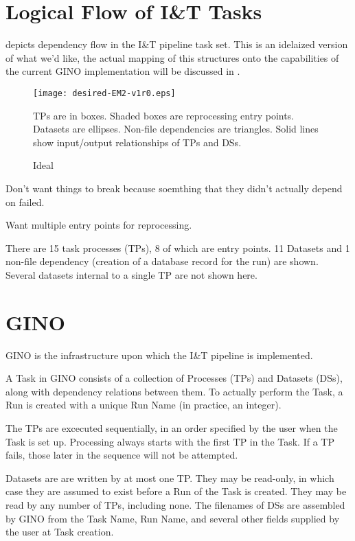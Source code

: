 \documentclass{article}
\begin{document}
\section{Logical Flow of I\&T Tasks}
\label{logic-sec}

{} depicts dependency flow in the I\&T pipeline task set.
This is an idelaized version of what we'd like, the actual mapping of this
structures onto the capabilities of the current GINO implementation will be
discussed in {}.

\begin{figure}
\caption{Ideal}

\texttt{[image: desired-EM2-v1r0.eps]}

{TPs are in boxes. Shaded boxes are reprocessing entry points.  Datasets are
ellipses. Non-file dependencies are triangles.  Solid lines show input/output
relationships of TPs and DSs.}

\label{desired-fig}
\end{figure}

Don't want things to break because soemthing that they didn't actually depend
on failed.

Want multiple entry points for reprocessing.

There are 15 task processes (TPs), 8 of which are entry points.  11 Datasets
and 1 non-file dependency (creation of a database record for the run) are
shown.  Several datasets internal to a single TP are not shown here.

\section{GINO}
\label{gino-sec}

GINO is the infrastructure upon which the I\&T pipeline is implemented.

A Task in GINO consists of a collection of Processes (TPs) and Datasets (DSs),
along with dependency relations between them.  To actually perform the Task, a
Run is created with a unique Run Name (in practice, an integer).

The TPs are excecuted sequentially, in an order specified by the user when the
Task is set up.  Processing always starts with the first TP in the Task.  If a
TP fails, those later in the sequence will not be attempted.

Datasets are are written by at most one TP.  They may be read-only, in which
case they are assumed to exist before a Run of the Task is created.  They may
be read by any number of TPs, including none.  The filenames of DSs are
assembled by GINO from the Task Name, Run Name, and several other fields
supplied by the user at Task creation.
\end{document}
